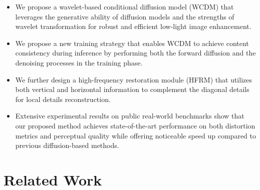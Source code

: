 \begin{itemize}
	\item We propose a wavelet-based conditional diffusion model (WCDM) that leverages the generative ability of diffusion models and the strengths of wavelet transformation for robust and efficient low-light image enhancement. 
	\item We propose a new training strategy that enables WCDM to achieve content consistency during inference by performing both the forward diffusion and the denoising processes in the training phase. 
	\item We further design a high-frequency restoration module (HFRM) that utilizes both vertical and horizontal information to complement the diagonal details for local details reconstruction.
	\item Extensive experimental results on public real-world benchmarks show that our proposed method achieves state-of-the-art performance on both distortion metrics and perceptual quality while offering noticeable speed up compared to previous diffusion-based methods.
\end{itemize}

\section{Related Work}\label{sec:related_work}
